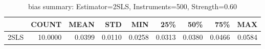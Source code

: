 \begin{table}[ht]
\centering
\caption{bias summary: Estimator=2SLS, Instruments=500, Strength=0.60}
\begin{tabular}{lrrrrrrrr}
\toprule
 & COUNT & MEAN & STD & MIN & 25\% & 50\% & 75\% & MAX \\
\midrule
2SLS & 10.0000 & 0.0399 & 0.0110 & 0.0258 & 0.0313 & 0.0380 & 0.0466 & 0.0584 \\
\bottomrule
\end{tabular}
\end{table}

